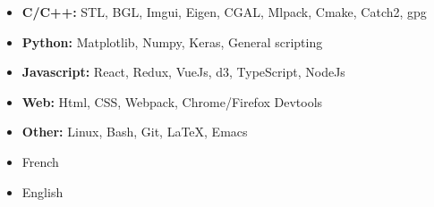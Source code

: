 \documentclass[10pt,a4paper,ragged2e,withhyper]{altacv}
\begin{document}
\begin{paracol}{2}
\divider




\begin{itemize}
\item \textbf{C/C++:} STL, BGL, Imgui, Eigen, CGAL, Mlpack, Cmake, Catch2, gpg
\item \textbf{Python:} Matplotlib, Numpy, Keras, General scripting
\item \textbf{Javascript:} React, Redux, VueJs, d3, TypeScript, NodeJs
\item \textbf{Web:} Html, CSS, Webpack, Chrome/Firefox Devtools
\item \textbf{Other:} Linux, Bash, Git, LaTeX, Emacs
\end{itemize}


\begin{itemize}
\item French
\item English
\end{itemize}

\end{paracol}
\end{document}
